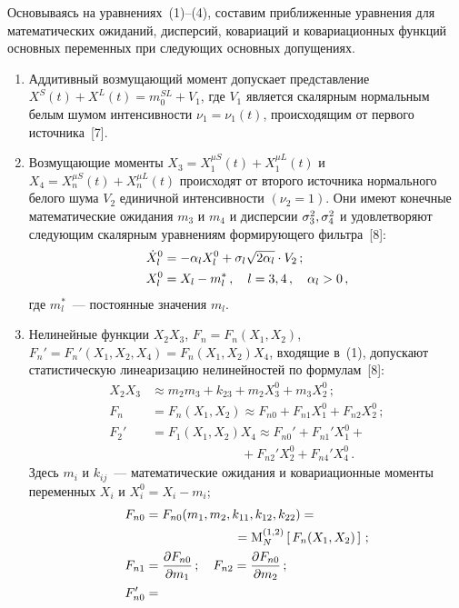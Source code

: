 \begin{multicols}{2}
Основываясь на уравнениях~(1)--(4), составим приближенные уравнения
для математических ожиданий, дисперсий, ковариаций и ковариационных
функций основных переменных при сле\-ду\-ющих основных допущениях.
\begin{enumerate}[1{$^\circ$}]
\item Аддитивный возмущающий момент допускает представление
$X^S (t) + X^L (t) = m_0^{SL}+V_1$, где $V_1 $ является скалярным
нормальным белым шумом интенсивности $\nu_1 = \nu_1(t)$, происходящим
от первого источника~[7].
\item
Возмущающие моменты  $X_3 = X^{\mu S}_1 (t) + X_1^{\mu L} (t)$
и $X_4 = X_n^{\mu S} (t) + X_n^{\mu L}(t)$ происходят от второго
источника нормального белого шума  $V_2$ единичной интенсивности
$(\nu_2 =1)$. Они имеют конечные математические ожидания  $m_3$ и
$m_4$ и дисперсии  $\sigma_3^2, \sigma_4^2$ и удовлетворяют следующим
скалярным уравнениям формирующего фильт\-ра~[8]:
\begin{align*}
\dot X_l^0 &=-\alpha_l X_l^0 + \sigma_l \sqrt{2\alpha_l}\cdot V_2\,;\\
 X_l^0 &= X_l- m_l^*\,,\quad l=3,4\,,\quad \alpha_l>0\,,
\end{align*}
где  $m_l^*$~--- постоянные значения  $m_l$.
     \item
Нелинейные функции  $X_2 X_3$, $F_n = F_n (X_1, X_2)$, $ F_n'=
F_n' ( X_1, X_2, X_4)= F_n (X_1, X_2) X_4$, входящие в~(1),
допускают статистическую линеаризацию нелинейностей по формулам~[8]:
    \begin{align*}
X_2 X_3 &\approx m_2 m_3 + k_{23}+ m_2 X_3^0 + m_3 X_2^0\, ;\\
F_n &= F_n (X_1,X_2)\approx F_{n0}+F_{n1} X_1^0+ F_{n2} X_2^0\,;\\
F_2' &= F_1 (X_1, X_2) X_4 \approx F_{n0}' +F_{n1}' X_1^0+{}\\
&\ \ \ \ \ \ \ \ \ \ \ \ \ \ \ \ \ \ \ \ \ \ \ \ \ \ \ \ \ \ \ \ {}+ F_{n2}' X_2^0 + F_{n4}' X_4^0\,.
\end{align*}
Здесь $m_i$ и $k_{ij}$~--- математические ожидания и ковариационные
моменты  переменных $X_i$ и $ X_i^0=X_i - m_i$;
\begin{align*}
F_{n0} &= F_{n0} (m_1, m_2, k_{11}, k_{12}, k_{22}) ={}\\
&\ \ \ \ \ \ \ \ \ \ \ \ \ \ \ \ \ \ \ \ \ {}= \mm_N^{(1,2)} \lk F_n (X_1, X_2)\rk\,;\\
F_{n1} &=\fr{\partial F_{n0}}{\partial m_1}\,;\quad F_{n2} =\fr{\partial F_{n0}}{\partial m_2}\,;\\
F_{n0}' &={}\\

\end{align*}
\end{enumerate}
\end{multicols}

